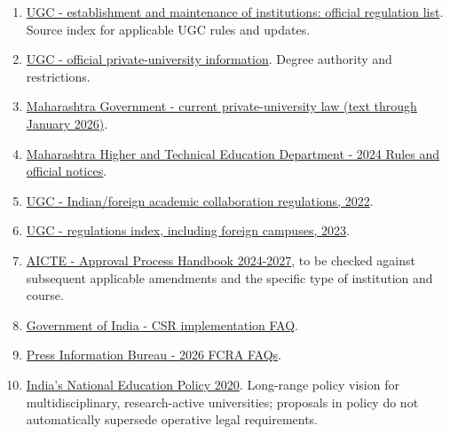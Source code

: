 \begin{enumerate}[leftmargin=*,itemsep=1.5pt]
  \item \href{https://www.ugc.gov.in/\allowbreak regulations/UGC_Regulations_university}{UGC - establishment and maintenance of institutions: official regulation list}. Source index for applicable UGC rules and updates.
  \item \href{https://www.ugc.gov.in/\allowbreak universitydetails/universityother?type=0wBmFB1Rb4JGVzq9UP\%2FiOg\%3D\%3D}{UGC - official private-university information}. Degree authority and restrictions.
  \item \href{https://lj.maharashtra.gov.in/\allowbreak en/document/\allowbreak the-maharashtra-private-universities-establishment-and-regulation-act-2023-text-as-on-13th-january-2026/}{Maharashtra Government - current private-university law (text through January 2026)}.
  \item \href{https://htedu.maharashtra.gov.in/\allowbreak Main/MaharashtraPrivateUniversitiesAct}{Maharashtra Higher and Technical Education Department - 2024 Rules and official notices}.
  \item \href{https://www.ugc.gov.in/\allowbreak KeyInitiative?ID=\%2F1JT+8jW785lBIAsbqDMVw\%3D\%3D}{UGC - Indian/\allowbreak foreign academic collaboration regulations, 2022}.
  \item \href{https://www.ugc.gov.in/\allowbreak regulations}{UGC - regulations index, including foreign campuses, 2023}.
  \item \href{https://www.aicte.gov.in/\allowbreak sites/default/\allowbreak files/APH\%20Final.pdf}{AICTE - Approval Process Handbook 2024-2027}, to be checked against subsequent applicable amendments and the specific type of institution and course.
  \item \href{https://www.csrxchange.gov.in/\allowbreak Frontend/faq}{Government of India - CSR implementation FAQ}.
  \item \href{https://www.pib.gov.in/\allowbreak FaqDetails.aspx?ModuleId=4\&NoteId=159301\&id=159301\&lang=1\&reg=48}{Press Information Bureau - 2026 FCRA FAQs}.
  \item \href{https://www.education.gov.in/\allowbreak sites/upload_files/mhrd/\allowbreak files/NEP_Final_English_0.pdf}{India's National Education Policy 2020}. Long-range policy vision for multidisciplinary, research-active universities; proposals in policy do not automatically supersede operative legal requirements.
\end{enumerate}

